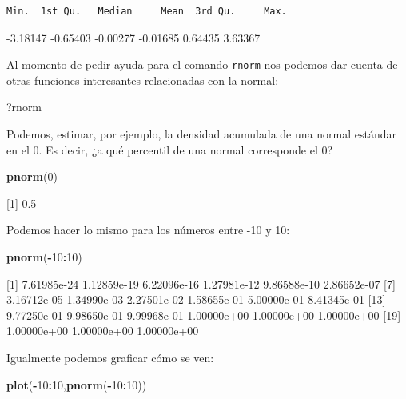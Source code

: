 \documentclass[
]{book}
\newenvironment{Shaded}{\begin{snugshade}}{\end{snugshade}}
\newcommand{\DecValTok}[1]{\textcolor[rgb]{0.00,0.00,0.81}{#1}}
\newcommand{\KeywordTok}[1]{\textcolor[rgb]{0.13,0.29,0.53}{\textbf{#1}}}
\newcommand{\NormalTok}[1]{#1}
\newcommand{\OperatorTok}[1]{\textcolor[rgb]{0.81,0.36,0.00}{\textbf{#1}}}
\begin{document}
\begin{verbatim}
Min.  1st Qu.   Median     Mean  3rd Qu.     Max. 
\end{verbatim}

-3.18147 -0.65403 -0.00277 -0.01685 0.64435 3.63367

Al momento de pedir ayuda para el comando \texttt{rnorm} nos podemos dar cuenta de otras funciones interesantes relacionadas con la normal:

\begin{Shaded}
\begin{Highlighting}[]
\NormalTok{?rnorm}
\end{Highlighting}
\end{Shaded}

Podemos, estimar, por ejemplo, la densidad acumulada de una normal estándar en el 0. Es decir, ¿a qué percentil de una normal corresponde el 0?

\begin{Shaded}
\begin{Highlighting}[]
\KeywordTok{pnorm}\NormalTok{(}\DecValTok{0}\NormalTok{)}
\end{Highlighting}
\end{Shaded}

{[}1{]} 0.5

Podemos hacer lo mismo para los números entre -10 y 10:

\begin{Shaded}
\begin{Highlighting}[]
\KeywordTok{pnorm}\NormalTok{(}\OperatorTok{-}\DecValTok{10}\OperatorTok{:}\DecValTok{10}\NormalTok{)}
\end{Highlighting}
\end{Shaded}

{[}1{]} 7.61985e-24 1.12859e-19 6.22096e-16 1.27981e-12 9.86588e-10 2.86652e-07
{[}7{]} 3.16712e-05 1.34990e-03 2.27501e-02 1.58655e-01 5.00000e-01 8.41345e-01
{[}13{]} 9.77250e-01 9.98650e-01 9.99968e-01 1.00000e+00 1.00000e+00 1.00000e+00
{[}19{]} 1.00000e+00 1.00000e+00 1.00000e+00

Igualmente podemos graficar cómo se ven:

\begin{Shaded}
\begin{Highlighting}[]
\KeywordTok{plot}\NormalTok{(}\OperatorTok{-}\DecValTok{10}\OperatorTok{:}\DecValTok{10}\NormalTok{,}\KeywordTok{pnorm}\NormalTok{(}\OperatorTok{-}\DecValTok{10}\OperatorTok{:}\DecValTok{10}\NormalTok{))}
\end{Highlighting}
\end{Shaded}
\end{document}
